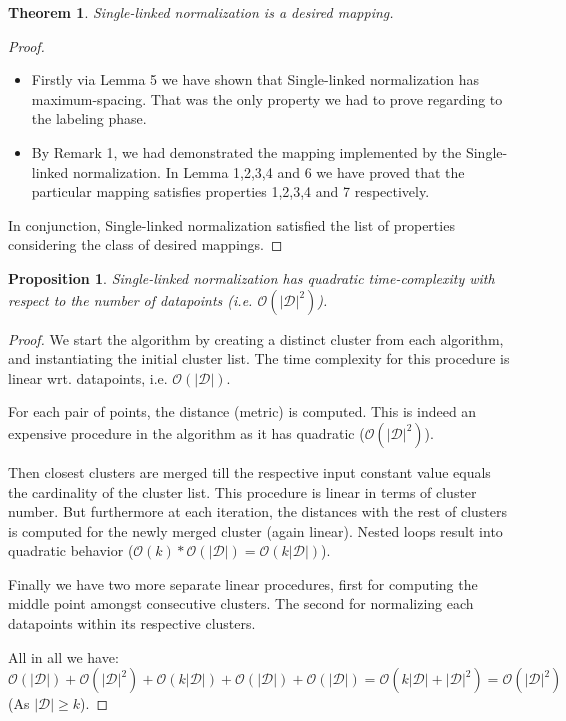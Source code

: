 \documentclass{article}
\newtheorem{proposition}{Proposition}
\newtheorem{theorem}{Theorem}
\newcommand{\dataset}{\mathcal{D}}   %
\begin{document}
\begin{theorem}
Single-linked normalization is a desired mapping.
\end{theorem}

\begin{proof}
\begin{itemize}
\item Firstly via Lemma 5 we have shown that Single-linked normalization has maximum-spacing. That was the only property we had to prove regarding to the labeling phase.
\item By Remark 1, we had demonstrated the mapping implemented by the Single-linked normalization. In Lemma 1,2,3,4 and 6 we have proved that the particular mapping satisfies properties 1,2,3,4 and 7 respectively.
\end{itemize}

In conjunction, Single-linked normalization satisfied the list of properties considering the class of desired mappings.
\end{proof}

\begin{proposition}
Single-linked normalization has quadratic time-complexity with respect to the number of datapoints (i.e. $\mathcal{O}(|\dataset|^2)$).
\end{proposition}

\begin{proof}
We start the algorithm by creating a distinct cluster from each algorithm, and instantiating the initial cluster list. The time complexity for this procedure is linear wrt. datapoints, i.e.  $\mathcal{O}(|\dataset|)$.

For each pair of points, the distance (metric) is computed. This is indeed an expensive procedure in the algorithm as it has quadratic ($\mathcal{O}(|\dataset|^2)$).

Then closest clusters are merged till the respective input constant value equals the cardinality of the cluster list. This procedure is linear in terms of cluster number. But furthermore at each iteration, the distances with the rest of clusters is computed for the newly merged cluster (again linear). Nested loops result into quadratic behavior  ($\mathcal{O}(k) * \mathcal{O}(|\dataset|) = \mathcal{O}(k|\dataset|)$).

Finally we have two more separate linear procedures, first for computing the middle point amongst consecutive clusters. The second for normalizing each datapoints within its respective clusters.

All in all we have:  $\mathcal{O}(|\dataset|) + \mathcal{O}(|\dataset|^2)  + \mathcal{O}(k|\dataset|)  + \mathcal{O}(|\dataset|) + \mathcal{O}(|\dataset|) =  \mathcal{O}(k|\dataset| + |\dataset|^2) = \mathcal{O}(|\dataset|^2) $  (As $|\dataset| \geq k$).

\end{proof}
\end{document}
